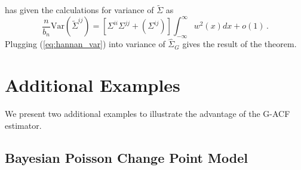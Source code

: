 \documentclass[11pt]{article}
\newcommand{\Var}{\text{Var}}
\theoremstyle{remark}
\begin{document}
\cite{hannan:1970} has given the calculations for variance of $\tilde{\Sigma}$ as 
\begin{equation} \label{eq:hannan_var}
\dfrac{n}{b_n}\Var(\tilde{\Sigma}^{ij}) = \left[\Sigma^{ii}\Sigma^{jj} + \left(\Sigma^{ij} \right) \right]\int_{-\infty}^{\infty}w^2(x)dx + o(1)\,.
\end{equation}
Plugging (\ref{eq:hannan_var}) into variance of $\hat{\Sigma}_{G}$ gives the result of the theorem.
 

\section{Additional Examples}
We present two additional examples to illustrate the advantage of the G-ACF estimator. 
\subsection{Bayesian Poisson Change Point Model}

\end{document}
